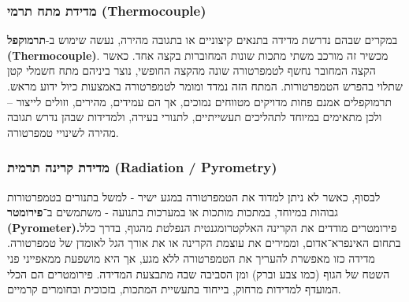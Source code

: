 \documentclass[
  hebrew,
  letterpaper,
  DIV=11,
  numbers=noendperiod]{scrreprt}
\begin{document}
\subsubsection{\texorpdfstring{{מדידת מתח תרמי}
(Thermocouple)}{מדידת מתח תרמי (Thermocouple)}}\label{ux5deux5d3ux5d9ux5d3ux5ea-ux5deux5eaux5d7-ux5eaux5e8ux5deux5d9-thermocouple}

{במקרים שבהם נדרשת מדידה בתנאים קיצוניים או בתגובה מהירה, נעשה שימוש
ב-\textbf{תרמוקפל}} \textbf{(Thermocouple)}{. מכשיר זה מורכב משתי מתכות
שונות המחוברות בקצה אחד}. {כאשר הקצה המחובר נחשף לטמפרטורה שונה מהקצה
החופשי, נוצר ביניהם מתח חשמלי קטן שתלוי בהפרש הטמפרטורות}. {המתח הזה
נמדד ומומר לטמפרטורה באמצעות כיול ידוע מראש}. {תרמוקפלים אמנם פחות
מדויקים מטווחים נמוכים, אך הם עמידים, מהירים, וזולים לייצור -- ולכן
מתאימים במיוחד לתהליכים תעשייתיים, לתנורי בעירה, ולמדידות שבהן נדרש
תגובה מהירה לשינויי טמפרטורה}.

\subsubsection{\texorpdfstring{{מדידת קרינה תרמית} (Radiation /
Pyrometry)}{מדידת קרינה תרמית (Radiation / Pyrometry)}}\label{ux5deux5d3ux5d9ux5d3ux5ea-ux5e7ux5e8ux5d9ux5e0ux5d4-ux5eaux5e8ux5deux5d9ux5ea-radiation-pyrometry}

{לבסוף, כאשר לא ניתן למדוד את הטמפרטורה במגע ישיר - למשל בתנורים
בטמפרטורות גבוהות במיוחד, במתכות מותכות או במערכות בתנועה - משתמשים
ב־\textbf{פירומטר (}}\textbf{Pyrometer{).}}{פירומטרים מודדים את הקרינה
האלקטרומגנטית הנפלטת מהגוף, בדרך כלל בתחום האינפרא־אדום, וממירים את
עוצמת הקרינה או את אורך הגל לאומדן של טמפרטורה}. {מדידה כזו מאפשרת
להעריך את הטמפרטורה ללא מגע, אך היא מושפעת ממאפייני פני השטח של הגוף
(כמו צבע וברק) ומן הסביבה שבה מתבצעת המדידה}. {פירומטרים הם הכלי המועדף
למדידות מרחוק, בייחוד בתעשיית המתכות, בזכוכית ובחומרים קרמיים}.
\end{document}
